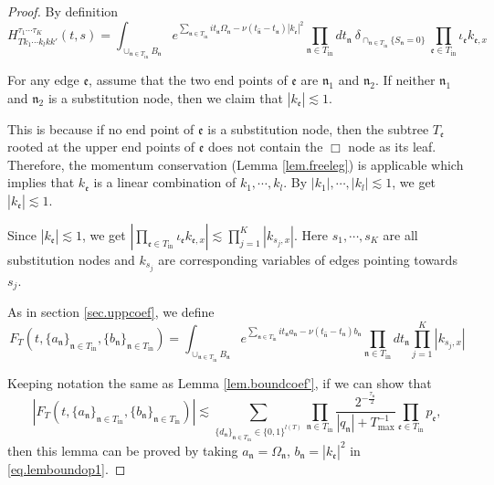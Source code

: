 \begin{proof} By definition
\begin{equation}
H^{\tau_1\cdots \tau_{K}}_{Tk_1\cdots k_{l}kk'}(t,s)=\int_{\cup_{\mathfrak{n}\in T_{\text{in}}} B_{\mathfrak{n}}} e^{\sum_{\mathfrak{n}\in T_{\text{in}}} it_{\mathfrak{n}}\Omega_{\mathfrak{n}}-\nu(t_{\widehat{\mathfrak{n}}}-t_{\mathfrak{n}})|k_{\mathfrak{e}}|^2}  %
\prod_{\mathfrak{n}\in T_{\text{in}}} dt_{\mathfrak{n}} 
\ \delta_{\cap_{\mathfrak{n}\in T_{\text{in}}} \{S_{\mathfrak{n}}=0\}}\ \prod_{\mathfrak{e}\in T_{\text{in}}}\iota_{\mathfrak{e}}k_{\mathfrak{e},x}
\end{equation}

For any edge $\mathfrak{e}$, assume that the two end points of $\mathfrak{e}$ are $\mathfrak{n}_1$ and $\mathfrak{n}_2$. If neither $\mathfrak{n}_1$ and $\mathfrak{n}_2$ is a substitution node, then we claim that $|k_{\mathfrak{e}}|\lesssim 1$. 

This is because if no end point of $\mathfrak{e}$ is a substitution node, then the subtree $T_{\mathfrak{e}}$ rooted at the upper end points of $\mathfrak{e}$ does not contain the $\Box$ node as its leaf. Therefore, the momentum conservation (Lemma \ref{lem.freeleg}) is applicable which implies that $k_{\mathfrak{e}}$ is a linear combination of $k_1,\cdots,k_{l}$. By $|k_1|, \cdots, |k_{l}|\lesssim 1$, we get $|k_{\mathfrak{e}}|\lesssim 1$. 

Since $|k_{\mathfrak{e}}|\lesssim 1$, we get $\left|\prod_{\mathfrak{e}\in T_{\text{in}}}\iota_{\mathfrak{e}}k_{\mathfrak{e},x}\right|\lesssim \prod^K_{j=1}|k_{s_j,x}|$. Here $s_1, \cdots, s_K$ are all substitution nodes and $k_{s_j}$ are corresponding variables of edges pointing towards $s_j$.


As in section \ref{sec.uppcoef}, we define 
\begin{equation}\label{eq.defF_Toperator}
F_{T}(t,\{a_{\mathfrak{n}}\}_{\mathfrak{n}\in T_{\text{in}}},\{b_{\mathfrak{n}}\}_{\mathfrak{n}\in T_{\text{in}}})=\int_{\cup_{\mathfrak{n}\in T_{\text{in}}} B_{\mathfrak{n}}} e^{\sum_{\mathfrak{n}\in T_{\text{in}}} it_{\mathfrak{n}} a_{\mathfrak{n}} - \nu(t_{\widehat{\mathfrak{n}}}-t_{\mathfrak{n}})b_{\mathfrak{n}}} \prod_{\mathfrak{n}\in T_{\text{in}}} dt_{\mathfrak{n}} \prod^K_{j=1}|k_{s_j,x}|
\end{equation}

Keeping notation the same as Lemma \ref{lem.boundcoef'}, if we can show that
\begin{equation}\label{eq.lemboundop1}
    |F_{T}(t,\{a_{\mathfrak{n}}\}_{\mathfrak{n}\in T_{\text{in}}},\{b_{\mathfrak{n}}\}_{\mathfrak{n}\in T_{\text{in}}})|\lesssim\sum_{\{d_{\mathfrak{n}}\}_{\mathfrak{n}\in T_{\text{in}}}\in\{0,1\}^{l(T)}}\prod_{\mathfrak{n}\in T_{\text{in}}}\frac{2^{-\frac{\tau_{\mathfrak{n}}}{2}}}{|q_{\mathfrak{n}}|+T^{-1}_{\text{max}}}\prod_{\mathfrak{e}\in T_{\text{in}}} p_{\mathfrak{e}}
,
\end{equation}
then this lemma can be proved by taking $a_{\mathfrak{n}}=\Omega_{\mathfrak{n}}$, $b_{\mathfrak{n}}=|k_{\mathfrak{e}}|^2$ in \eqref{eq.lemboundop1}.


\end{proof}
